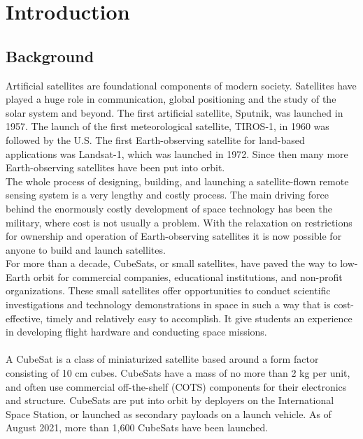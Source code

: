 \chapter{Introduction}

\justifying
\section{Background}

     Artificial satellites are foundational components of modern society. Satellites have played a huge role in communication, global positioning and the study of the solar system and beyond. The first artificial satellite, Sputnik, was launched in 1957. The launch of the first
meteorological satellite, TIROS-1, in 1960 was followed by the U.S. The first Earth-observing satellite for land-based applications was Landsat-1, which was launched in 1972. Since then many more Earth-observing satellites have been put into orbit. 
\\

The whole process of designing, building, and launching a satellite-flown remote sensing system is a very lengthy and costly process. The main driving force behind the enormously costly development
of space technology has been the military, where cost is not usually a problem. With the relaxation on restrictions for ownership and operation of Earth-observing satellites it is now possible for anyone to build and launch satellites.
\\

For more than a decade, CubeSats, or small satellites, have paved the way to
low-Earth orbit for commercial companies, educational institutions, and non-profit
organizations. These small satellites offer opportunities to conduct scientific
investigations and technology demonstrations in space in such a way that is
cost-effective, timely and relatively easy to accomplish.
It give students an
experience in developing flight hardware and conducting space missions.\\

\\
A CubeSat is a class of miniaturized satellite based around a form factor consisting
of 10 cm cubes. CubeSats have a mass of no more than 2 kg per unit, and often use
commercial off-the-shelf (COTS) components for their electronics and structure.
CubeSats are put into orbit by deployers on the International Space Station, or
launched as secondary payloads on a launch vehicle. As of August 2021, more than
1,600 CubeSats have been launched.
\\

